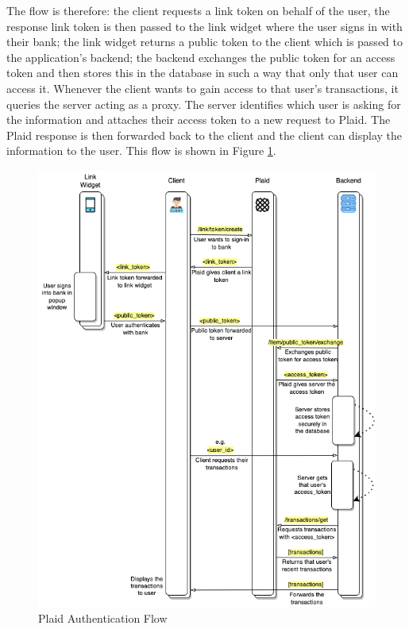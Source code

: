 The flow is therefore: the client requests a link token on behalf of the user, the response link token is then passed to the link widget where the user signs in with their bank; the link widget returns a public token to the client which is passed to the application's backend; the backend exchanges the public token for an access token and then stores this in the database in such a way that only that user can access it. Whenever the client wants to gain access to that user's transactions, it queries the server acting as a proxy. The server identifies which user is asking for the information and attaches their access token to a new request to Plaid. The Plaid response is then forwarded back to the client and the client can display the information to the user. This flow is shown in Figure \ref{fig:plaid_auth_flow}.

\begin{figure}[H]
	\centering
    \includegraphics[width=\textwidth]{Plaid_auth_flow_sequence_diagram.png}
	\vspace{-0.8cm}
    \caption{Plaid Authentication Flow}
    \label{fig:plaid_auth_flow}
\end{figure}

